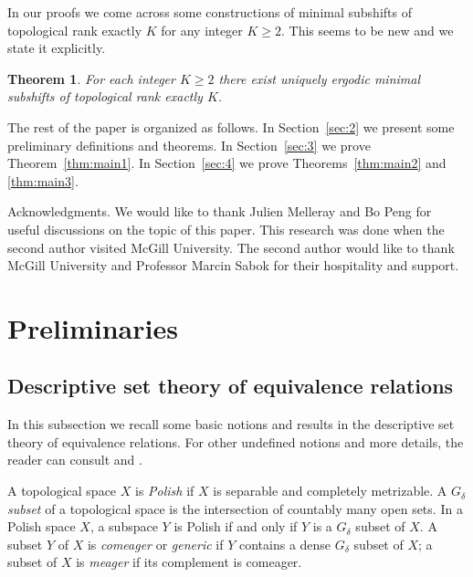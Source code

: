 \documentclass{amsart}
\newtheorem{theorem}{Theorem}[section]
\theoremstyle{definition}
\theoremstyle{problem}
\theoremstyle{remark}
\numberwithin{equation}{section}
\begin{document}
In our proofs we come across some constructions of minimal subshifts of topological rank exactly $K$ for any integer $K\geq 2$. This seems to be new and we state it explicitly.

\begin{theorem} For each integer $K\geq 2$ there exist uniquely ergodic minimal subshifts of topological rank exactly $K$.
\end{theorem}

The rest of the paper is organized as follows. In Section~\ref{sec:2} we present some preliminary definitions and theorems. In Section~\ref{sec:3} we prove Theorem~\ref{thm:main1}. In Section~\ref{sec:4} we prove Theorems~\ref{thm:main2} and \ref{thm:main3}.

{\sc Acknowledgments.} We would like to thank Julien Melleray and Bo Peng for useful discussions on the topic of this paper. This research was done when the second author visited McGill University. The second author would like to thank McGill University and Professor Marcin Sabok for their hospitality and support.  










\section{Preliminaries \label{sec:2}}

\subsection{Descriptive set theory of equivalence relations}
In this subsection we recall some basic notions and results in the descriptive set theory of equivalence relations. For other undefined notions and more details, the reader can consult \cite{KechrisBook} and \cite{GaoBook}. 

A topological space $X$ is {\em Polish} if $X$ is separable and completely metrizable. A {\em $G_\delta$ subset} of a topological space is the intersection of countably many open sets. In a Polish space $X$, a subspace $Y$ is Polish if and only if $Y$ is a $G_\delta$ subset of $X$. A subset $Y$ of $X$ is {\em comeager} or {\em generic} if $Y$ contains a dense $G_\delta$ subset of $X$; a subset of $X$ is {\em meager} if its complement is comeager. 
\end{document}
